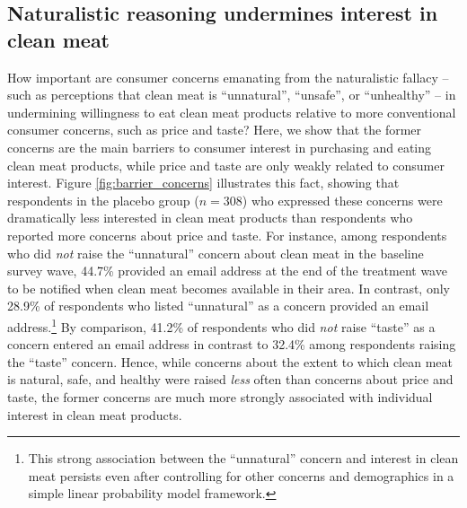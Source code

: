 \documentclass[12pt]{article}
\newcommand{\note}[1]{\textit{\textcolor{red}{$<$note$>$ #1 $<$/note$>$}}}
\begin{document}
\subsection{Naturalistic reasoning undermines interest in clean meat}


How important are consumer concerns emanating from the naturalistic fallacy -- such as perceptions that clean meat is ``unnatural'', ``unsafe'', or ``unhealthy'' -- in undermining willingness to eat clean meat products relative to more conventional consumer concerns, such as price and taste? Here, we show that the former concerns are the main barriers to consumer interest in purchasing and eating clean meat products, while price and taste are only weakly related to consumer interest. Figure \ref{fig:barrier_concerns} illustrates this fact, showing that respondents in the placebo group ($n=308$) who expressed these concerns were dramatically less interested in clean meat products than respondents who reported more concerns about price and taste. For instance, among respondents who did \textit{not} raise the ``unnatural'' concern about clean meat in the baseline survey wave, 44.7\% provided an email address at the end of the treatment wave to be notified when clean meat becomes available in their area. In contrast, only 28.9\% of respondents who listed ``unnatural'' as a concern provided an email address.\footnote{This strong association between the ``unnatural'' concern and interest in clean meat persists even after controlling for other concerns and demographics in a simple linear probability model framework.} By comparison, 41.2\% of respondents who did \textit{not} raise ``taste'' as a concern entered an email address in contrast to 32.4\% among respondents raising the ``taste'' concern. Hence, while concerns about the extent to which clean meat is natural, safe, and healthy were raised \textit{less} often than concerns about price and taste, the former concerns are much more strongly associated with individual interest in clean meat products.

\end{document}
